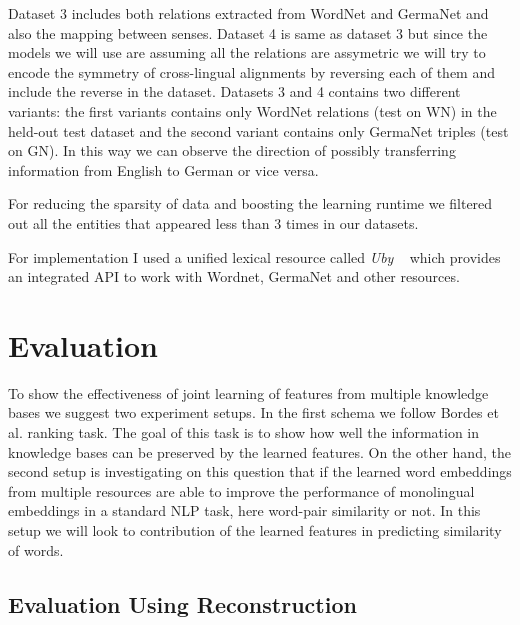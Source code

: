 Dataset 3 includes both relations extracted from WordNet and GermaNet and also the mapping between senses.
 Dataset 4 is same as dataset 3 but since the models we will use are assuming all the relations are assymetric 
 we will try to encode the symmetry of cross-lingual alignments by reversing each of them and include the reverse in the dataset.
 Datasets 3 and 4 contains two different variants: the first variants contains only WordNet relations (test on WN) 
 in the held-out test dataset and the second variant contains only GermaNet triples (test on GN).
  In this way we can observe the direction of
  possibly transferring information from English to German or vice versa.
  
  For reducing the sparsity of data and boosting the learning runtime we 
  filtered out all the entities that appeared less than 3 times in our datasets.
   
  For implementation I used a unified lexical resource called \textit{Uby}
  ~\cite{Eckle-Kohler2012} which provides an integrated API to work with
  Wordnet, GermaNet and other resources.
 

\section{Evaluation}
\label{sec:ent-link-eval}

To show the effectiveness of joint learning of features from multiple knowledge bases we suggest 
two experiment setups. In the first schema we follow Bordes et al. ranking task. The goal of this task is
to show how well the information in knowledge bases can be preserved by the learned features. 
 On the other hand, the second
setup is investigating on this question that if the learned word embeddings from multiple resources
are able to improve the performance of monolingual embeddings in a standard NLP
task, here word-pair similarity or not.
In this setup we will look to contribution of the learned features in predicting similarity of words.

\subsection{Evaluation Using Reconstruction}
\label{ssec:ent-link-intrinsic}

